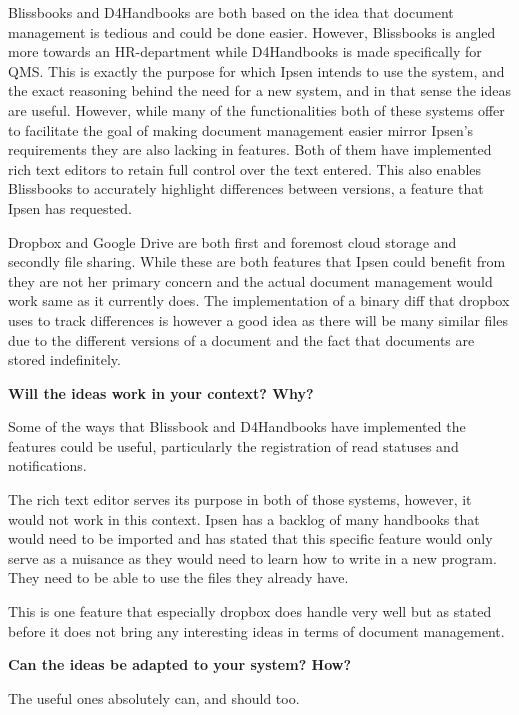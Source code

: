 Blissbooks and D4Handbooks are both based on the idea that document management is tedious and could be done easier.
However, Blissbooks is angled more towards an HR-department while D4Handbooks is made specifically for QMS.
This is exactly the purpose for which Ipsen intends to use the system, and the exact reasoning behind the need for a new system, and in that sense the ideas are useful.
However, while many of the functionalities both of these systems offer to facilitate the goal of making document management easier mirror Ipsen's requirements they are also lacking in features.
Both of them have implemented rich text editors to retain full control over the text entered. 
This also enables Blissbooks to accurately highlight differences between versions, a feature that Ipsen has requested.

Dropbox and Google Drive are both first and foremost cloud storage and secondly file sharing. 
While these are both features that Ipsen could benefit from they are not her primary concern and the actual document management would work same as it currently does.
The implementation of a binary diff that dropbox uses to track differences is however a good idea as there will be many similar files due to the different versions of a document and the fact that documents are stored indefinitely.

\textbf{Will the ideas work in your context? Why?}

Some of the ways that Blissbook and D4Handbooks have implemented the features could be useful, particularly the registration of read statuses and notifications.

The rich text editor serves its purpose in both of those systems, however, it would not work in this context.
Ipsen has a backlog of many handbooks that would need to be imported and has stated that this specific feature would only serve as a nuisance as they would need to learn how to write in a new program.
They need to be able to use the files they already have.

This is one feature that especially dropbox does handle very well but as stated before it does not bring any interesting ideas in terms of document management.

\textbf{Can the ideas be adapted to your system? How?}

The useful ones absolutely can, and should too.
